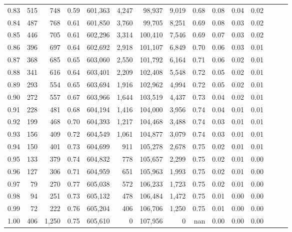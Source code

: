 \begin{tabular}{rrrrrrrrrrrrrrr}
0.83 &     515 &    748 &  0.59 &  601,363 &    4,247 &   98,937 &    9,019 &  0.68 &  0.08 &  0.04 &      0.02 \\
0.84 &     487 &    768 &  0.61 &  601,850 &    3,760 &   99,705 &    8,251 &  0.69 &  0.08 &  0.03 &      0.02 \\
0.85 &     446 &    705 &  0.61 &  602,296 &    3,314 &  100,410 &    7,546 &  0.69 &  0.07 &  0.03 &      0.02 \\
0.86 &     396 &    697 &  0.64 &  602,692 &    2,918 &  101,107 &    6,849 &  0.70 &  0.06 &  0.03 &      0.01 \\
0.87 &     368 &    685 &  0.65 &  603,060 &    2,550 &  101,792 &    6,164 &  0.71 &  0.06 &  0.02 &      0.01 \\
0.88 &     341 &    616 &  0.64 &  603,401 &    2,209 &  102,408 &    5,548 &  0.72 &  0.05 &  0.02 &      0.01 \\
0.89 &     293 &    554 &  0.65 &  603,694 &    1,916 &  102,962 &    4,994 &  0.72 &  0.05 &  0.02 &      0.01 \\
0.90 &     272 &    557 &  0.67 &  603,966 &    1,644 &  103,519 &    4,437 &  0.73 &  0.04 &  0.02 &      0.01 \\
0.91 &     228 &    481 &  0.68 &  604,194 &    1,416 &  104,000 &    3,956 &  0.74 &  0.04 &  0.01 &      0.01 \\
0.92 &     199 &    468 &  0.70 &  604,393 &    1,217 &  104,468 &    3,488 &  0.74 &  0.03 &  0.01 &      0.01 \\
0.93 &     156 &    409 &  0.72 &  604,549 &    1,061 &  104,877 &    3,079 &  0.74 &  0.03 &  0.01 &      0.01 \\
0.94 &     150 &    401 &  0.73 &  604,699 &      911 &  105,278 &    2,678 &  0.75 &  0.02 &  0.01 &      0.01 \\
0.95 &     133 &    379 &  0.74 &  604,832 &      778 &  105,657 &    2,299 &  0.75 &  0.02 &  0.01 &      0.00 \\
0.96 &     127 &    306 &  0.71 &  604,959 &      651 &  105,963 &    1,993 &  0.75 &  0.02 &  0.01 &      0.00 \\
0.97 &      79 &    270 &  0.77 &  605,038 &      572 &  106,233 &    1,723 &  0.75 &  0.02 &  0.01 &      0.00 \\
0.98 &      94 &    251 &  0.73 &  605,132 &      478 &  106,484 &    1,472 &  0.75 &  0.01 &  0.00 &      0.00 \\
0.99 &      72 &    222 &  0.76 &  605,204 &      406 &  106,706 &    1,250 &  0.75 &  0.01 &  0.00 &      0.00 \\
1.00 &     406 &  1,250 &  0.75 &  605,610 &        0 &  107,956 &        0 &   nan &  0.00 &  0.00 &      0.00 \\
\bottomrule
\end{tabular}
